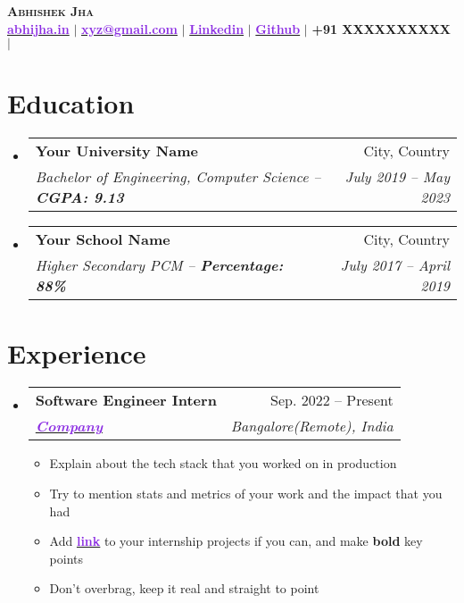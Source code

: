 \documentclass[letterpaper,11pt]{article}
\makeatletter
\newcommand{\resumeItem}[1]{
  \item\small{
    {#1 \vspace{-2pt}}
  }
}
\newcommand{\resumeSubheading}[4]{
  \vspace{-2pt}\item
    \begin{tabular*}{0.97\textwidth}[t]{l@{\extracolsep{\fill}}r}
      \textbf{#1} & #2 \\
      \textit{\small#3} & \textit{\small #4} \\
    \end{tabular*}\vspace{-7pt}
}
\newcommand{\resumeSubHeadingListStart}{\begin{itemize}[leftmargin=0.15in, label={}]}
\newcommand{\resumeSubHeadingListEnd}{\end{itemize}}
\newcommand{\resumeItemListStart}{\begin{itemize}}
\newcommand{\resumeItemListEnd}{\end{itemize}\vspace{-5pt}}
\makeatother
\begin{document}
\begin{center}
    \textbf{\Huge \scshape Abhishek Jha} \\ \vspace{2pt}
    \href{https://www.abhijha.in/}{\textcolor{BlueViolet}{\faGlobe\enspace \textbf{abhijha.in}}} $|$ 
    \href{mailto:abhi.jha.cs@gmail.com}{\textcolor{BlueViolet}{\faEnvelopeO\enspace \textbf{xyz@gmail.com}}} $|$ 
    \href{https://linkedin.com/in/abhijhacodes}{\textcolor{BlueViolet}{\faLinkedin\enspace \textbf{Linkedin}}} $|$
    \href{https://github.com/abhijhacodes}{\textcolor{BlueViolet}{\faGithub\enspace \textbf{Github}}} $|$
    \small {\faMobile\enspace \textbf{+91 XXXXXXXXXX}} $|$
\end{center}


\section{Education}
  \resumeSubHeadingListStart
    \resumeSubheading
      {Your University Name}{City, Country}
      {Bachelor of Engineering, Computer Science -- \textbf{CGPA: 9.13}}{July 2019 -- May 2023}
    \resumeSubheading
      {Your School Name}{City, Country}
      {Higher Secondary PCM -- \textbf{Percentage: 88\%}}{July 2017 -- April 2019}
  \resumeSubHeadingListEnd


\section{Experience}
  \resumeSubHeadingListStart
    \resumeSubheading
      {Software Engineer Intern}{Sep. 2022 -- Present}
      {\href{https://google.com/}{\textcolor{BlueViolet}{\textbf{\Large{Company}}}}}{Bangalore(Remote), India}
      \resumeItemListStart
        \resumeItem{Explain about the tech stack that you worked on in production}
        \resumeItem{Try to mention stats and metrics of your work and the impact that you had}
        \resumeItem{Add \href{https://google.com/}{\textcolor{BlueViolet}{\textbf{link}}} to your internship projects if you can, and make \textbf{bold} key points}
        \resumeItem{Don't overbrag, keep it real and straight to point}
      \resumeItemListEnd

  \resumeSubHeadingListEnd
\end{document}
